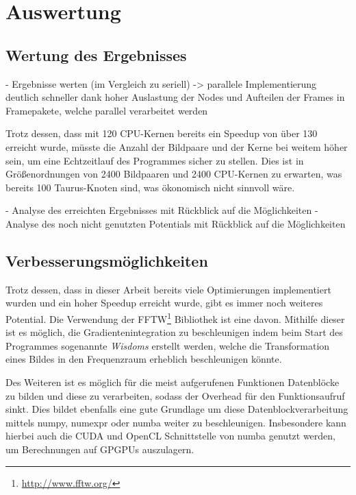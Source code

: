 \chapter{Auswertung}

\section{Wertung des Ergebnisses}

\begin{correctmore}
	- Ergebnisse werten (im Vergleich zu seriell)
	-> parallele Implementierung deutlich schneller dank hoher Auslastung der Nodes und Aufteilen der Frames in Framepakete, welche parallel verarbeitet werden
\end{correctmore}

Trotz dessen, dass mit 120 \gls{CPU}-Kernen bereits ein Speedup von über 130 erreicht wurde, müsste die Anzahl der Bildpaare und der Kerne bei weitem höher sein, um eine Echtzeitlauf des Programmes sicher zu stellen. Dies ist in Größenordnungen von 2400 Bildpaaren und 2400 \gls{CPU}-Kernen zu erwarten, was bereits 100 Taurus-Knoten sind, was ökonomisch nicht sinnvoll wäre. 

\begin{correctmore}
	- Analyse des erreichten Ergebnisses mit Rückblick auf die Möglichkeiten
	- Analyse des noch nicht genutzten Potentials mit Rückblick auf die Möglichkeiten
\end{correctmore}

\section{Verbesserungsmöglichkeiten}

Trotz dessen, dass in dieser Arbeit bereits viele Optimierungen implementiert wurden und ein hoher Speedup erreicht wurde, gibt es immer noch weiteres Potential. Die Verwendung der FFTW\footnote{\url{http://www.fftw.org/}} Bibliothek ist eine davon. Mithilfe dieser ist es möglich, die Gradientenintegration zu beschleunigen indem beim Start des Programmes sogenannte \textit{Wisdoms} erstellt werden, welche die Transformation eines Bildes in den Frequenzraum erheblich beschleunigen könnte. 

Des Weiteren ist es möglich für die meist aufgerufenen Funktionen Datenblöcke zu bilden und diese zu verarbeiten, sodass der Overhead für den Funktionsaufruf sinkt. Dies bildet ebenfalls eine gute Grundlage um diese Datenblockverarbeitung mittels numpy, numexpr oder numba weiter zu beschleunigen. Insbesondere kann hierbei auch die CUDA und OpenCL Schnittstelle von numba genutzt werden, um Berechnungen auf \glspl{GPGPU} auszulagern. 

